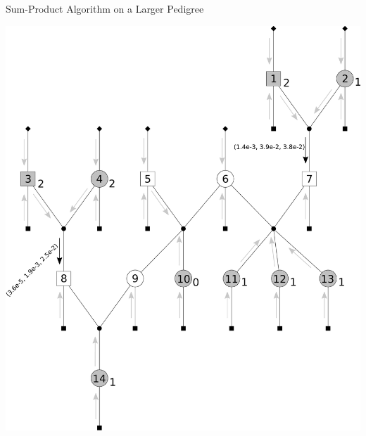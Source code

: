 \documentclass[letter,graphicx]{beamer}
\begin{document}
\begin{frame}{Sum-Product Algorithm on a Larger Pedigree} 
\begin{center} 
\includegraphics[height = 0.8\textheight]{./images/mg-example-step3.pdf} 
\end{center}
\end{frame}
\end{document}
